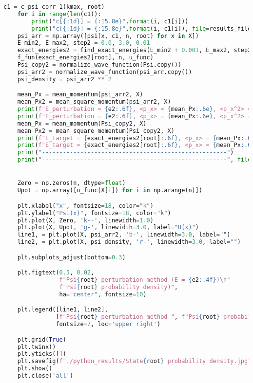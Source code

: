 \begin{lstlisting}[language=Python, caption=Код файла solver.py,label={lst:solver}]
    c1 = c_psi_corr_1(kmax, root)
    for i in range(len(c1)):
        print("c[{:1d}] = {:15.8e}".format(i, c1[i]))
        print("c[{:1d}] = {:15.8e}".format(i, c1[i]), file=results_file)
    psi_arr = np.array([psi(x, c1, n, root) for x in X])
    E_min2, E_max2, step2 = 0.0, 3.0, 0.01
    exact_energies2 = find_exact_energies(E_min2 + 0.001, E_max2, step2, tol, u_func)
    f_fun(exact_energies2[root], n, u_func)
    Psi_copy2 = normalize_wave_function(Psi.copy())
    psi_arr2 = normalize_wave_function(psi_arr.copy())
    psi_density = psi_arr2 ** 2

    mean_Px = mean_momentum(psi_arr2, X)
    mean_Px2 = mean_square_momentum(psi_arr2, X)
    print(f"E_perturbation = {e2:.6f}, <p_x> = {mean_Px:.6e}, <p_x^2> = {mean_Px2:.6e}")
    print(f"E_perturbation = {e2:.6f}, <p_x> = {mean_Px:.6e}, <p_x^2> = {mean_Px2:.6e}", file=results_file)
    mean_Px = mean_momentum(Psi_copy2, X)
    mean_Px2 = mean_square_momentum(Psi_copy2, X)
    print(f"E_target = {exact_energies2[root]:.6f}, <p_x> = {mean_Px:.6e}, <p_x^2> = {mean_Px2:.6e}")
    print(f"E_target = {exact_energies2[root]:.6f}, <p_x> = {mean_Px:.6e}, <p_x^2> = {mean_Px2:.6e}", file=results_file)
    print("-----------------------------------------------------")
    print("-----------------------------------------------------", file=results_file)


    Zero = np.zeros(n, dtype=float)
    Upot = np.array([u_func(X[i]) for i in np.arange(n)])

    plt.xlabel("x", fontsize=18, color="k")
    plt.ylabel("Psi(x)", fontsize=18, color="k")
    plt.plot(X, Zero, 'k--', linewidth=1.0)
    plt.plot(X, Upot, 'g-', linewidth=3.0, label="U(x)")
    line1, = plt.plot(X, psi_arr2, 'b-', linewidth=3.0, label="")
    line2, = plt.plot(X, psi_density, 'r-', linewidth=3.0, label="")

    plt.subplots_adjust(bottom=0.3)

    plt.figtext(0.5, 0.02,
                f"Psi{root} perturbation method (E = {e2:.4f})\n"
                f"Psi{root} probability density)",
                ha="center", fontsize=10)

    plt.legend([line1, line2],
               [f"Psi{root} perturbation method ", f"Psi{root} probability density"],
               fontsize=7, loc='upper right')

    plt.grid(True)
    plt.twinx()
    plt.yticks([])
    plt.savefig(f"./python_results/State{root} probability density.jpg", dpi=300)
    plt.show()
    plt.close('all')



\end{lstlisting}
